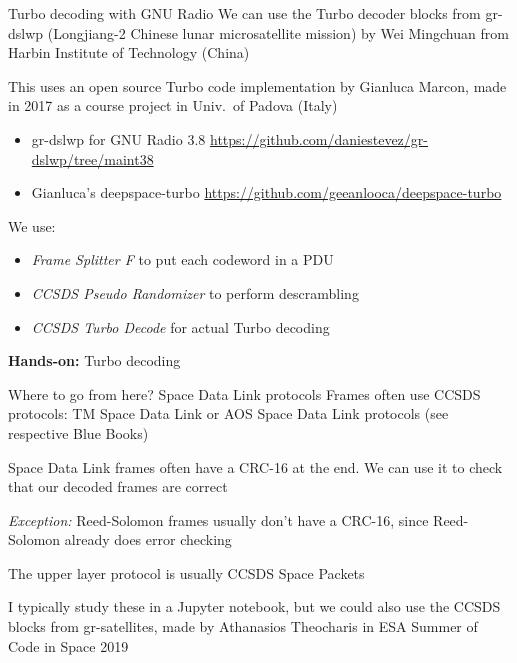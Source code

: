 \documentclass[aspectratio=169]{beamer}
\newcommand{\handson}[1]{\begin{frame}
 \begin{block}{}
   \begin{center}
     \vspace{0.5em}
     {\bf Hands-on:} #1
     \vspace{0.5em}
   \end{center}
 \end{block}
 \end{frame}
}
\begin{document}
\begin{frame}{Turbo decoding with GNU Radio}
  We can use the Turbo decoder blocks from gr-dslwp (Longjiang-2 Chinese lunar
  microsatellite mission) by Wei Mingchuan from Harbin Institute of Technology (China)

  This uses an open source Turbo code implementation by
  Gianluca Marcon, made in 2017 as a course project in Univ.~of Padova (Italy)

  \begin{itemize}
  \item gr-dslwp for GNU Radio 3.8 \url{https://github.com/daniestevez/gr-dslwp/tree/maint38}
  \item Gianluca's deepspace-turbo \url{https://github.com/geeanlooca/deepspace-turbo}
  \end{itemize}
  
  We use:
  \begin{itemize}
  \item \emph{Frame Splitter F} to put each codeword in a PDU
  \item \emph{CCSDS Pseudo Randomizer} to perform descrambling
  \item \emph{CCSDS Turbo Decode} for actual Turbo decoding
  \end{itemize}
\end{frame}

\handson{Turbo decoding}

\begin{frame}{Where to go from here? Space Data Link protocols}
  Frames often use CCSDS protocols: TM Space Data Link or AOS Space Data Link
  protocols (see respective Blue Books)

  \medskip

  Space Data Link frames often have a CRC-16 at the end. We can use it to check
  that our decoded frames are correct

  \emph{Exception:} Reed-Solomon frames usually don't have a CRC-16, since
  Reed-Solomon already does error checking

  \medskip

  The upper layer protocol is usually CCSDS Space Packets

  \medskip

  I typically study these in a Jupyter notebook, but we could also use the CCSDS
  blocks from gr-satellites, made by Athanasios Theocharis in ESA Summer of Code
  in Space 2019
\end{frame}
\end{document}
